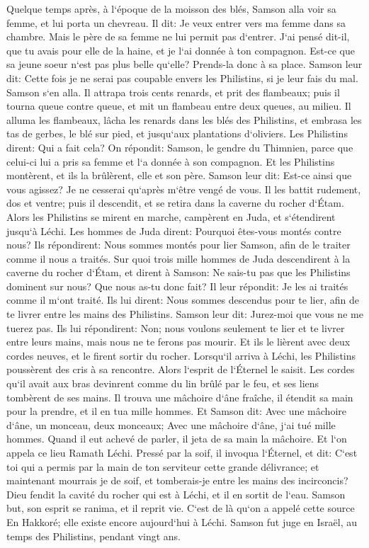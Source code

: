 \verse Quelque temps après, à l`époque de la moisson des blés, Samson alla voir sa femme, et lui porta un chevreau. Il dit: Je veux entrer vers ma femme dans sa chambre. Mais le père de sa femme ne lui permit pas d`entrer. 
\verse J`ai pensé dit-il, que tu avais pour elle de la haine, et je l`ai donnée à ton compagnon. Est-ce que sa jeune soeur n`est pas plus belle qu`elle? Prends-la donc à sa place. 
\verse Samson leur dit: Cette fois je ne serai pas coupable envers les Philistins, si je leur fais du mal. 
\verse Samson s`en alla. Il attrapa trois cents renards, et prit des flambeaux; puis il tourna queue contre queue, et mit un flambeau entre deux queues, au milieu. 
\verse Il alluma les flambeaux, lâcha les renards dans les blés des Philistins, et embrasa les tas de gerbes, le blé sur pied, et jusqu`aux plantations d`oliviers. 
\verse Les Philistins dirent: Qui a fait cela? On répondit: Samson, le gendre du Thimnien, parce que celui-ci lui a pris sa femme et l`a donnée à son compagnon. Et les Philistins montèrent, et ils la brûlèrent, elle et son père. 
\verse Samson leur dit: Est-ce ainsi que vous agissez? Je ne cesserai qu`après m`être vengé de vous. 
\verse Il les battit rudement, dos et ventre; puis il descendit, et se retira dans la caverne du rocher d`Étam. 
\verse Alors les Philistins se mirent en marche, campèrent en Juda, et s`étendirent jusqu`à Léchi. 
\verse Les hommes de Juda dirent: Pourquoi êtes-vous montés contre nous? Ils répondirent: Nous sommes montés pour lier Samson, afin de le traiter comme il nous a traités. 
\verse Sur quoi trois mille hommes de Juda descendirent à la caverne du rocher d`Étam, et dirent à Samson: Ne sais-tu pas que les Philistins dominent sur nous? Que nous as-tu donc fait? Il leur répondit: Je les ai traités comme il m`ont traité. 
\verse Ils lui dirent: Nous sommes descendus pour te lier, afin de te livrer entre les mains des Philistins. Samson leur dit: Jurez-moi que vous ne me tuerez pas. 
\verse Ils lui répondirent: Non; nous voulons seulement te lier et te livrer entre leurs mains, mais nous ne te ferons pas mourir. Et ils le lièrent avec deux cordes neuves, et le firent sortir du rocher. 
\verse Lorsqu`il arriva à Léchi, les Philistins poussèrent des cris à sa rencontre. Alors l`esprit de l`Éternel le saisit. Les cordes qu`il avait aux bras devinrent comme du lin brûlé par le feu, et ses liens tombèrent de ses mains. 
\verse Il trouva une mâchoire d`âne fraîche, il étendit sa main pour la prendre, et il en tua mille hommes. 
\verse Et Samson dit: Avec une mâchoire d`âne, un monceau, deux monceaux; Avec une mâchoire d`âne, j`ai tué mille hommes. 
\verse Quand il eut achevé de parler, il jeta de sa main la mâchoire. Et l`on appela ce lieu Ramath Léchi. 
\verse Pressé par la soif, il invoqua l`Éternel, et dit: C`est toi qui a permis par la main de ton serviteur cette grande délivrance; et maintenant mourrais je de soif, et tomberais-je entre les mains des incirconcis? 
\verse Dieu fendit la cavité du rocher qui est à Léchi, et il en sortit de l`eau. Samson but, son esprit se ranima, et il reprit vie. C`est de là qu`on a appelé cette source En Hakkoré; elle existe encore aujourd`hui à Léchi. 
\verse Samson fut juge en Israël, au temps des Philistins, pendant vingt ans. 


